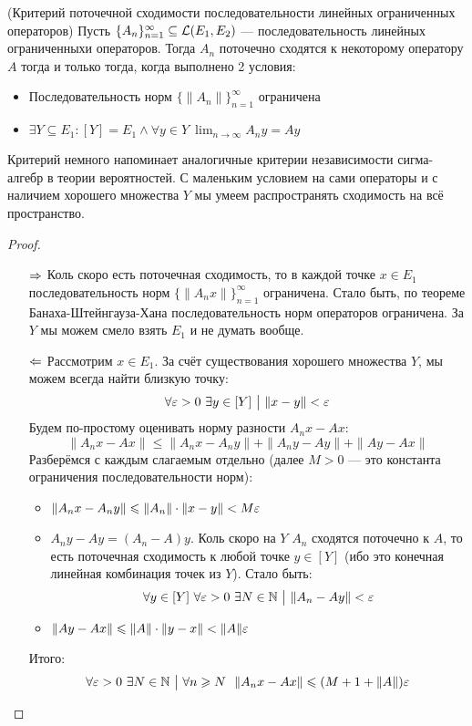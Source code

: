 \begin{theorem} (Критерий поточечной сходимости последовательности линейных ограниченных операторов)
	Пусть $\{A_n\}_{n = 1}^\infty \subseteq \mathcal{L}(E_1, E_2)$ --- последовательность линейных ограниченныхи операторов. Тогда $A_n$ поточечно сходятся к некоторому оператору $A$ тогда и только тогда, когда выполнено 2 условия:
	\begin{itemize}
		\item Последовательность норм $\{\|A_n\|\}_{n = 1}^\infty$ ограничена
		
		\item $\exists Y \subseteq E_1 \colon [Y] = E_1 \wedge \forall y \in Y\ \lim_{n \to \infty} A_ny = Ay$
	\end{itemize}
\end{theorem}

\begin{anote}
	Критерий немного напоминает аналогичные критерии независимости сигма-алгебр в теории вероятностей. С маленьким условием на сами операторы и с наличием хорошего множества $Y$ мы умеем распространять сходимость на всё пространство.
\end{anote}

\begin{proof}~
	\begin{itemize}
		\item[$\Rightarrow$] Коль скоро есть поточечная сходимость, то в каждой точке $x \in E_1$ последовательность норм $\{\|A_nx\|\}_{n = 1}^\infty$ ограничена. Стало быть, по теореме Банаха-Штейнгауза-Хана последовательность норм операторов ограничена. За $Y$ мы можем смело взять $E_1$ и не думать вообще.
		
		\item[$\Leftarrow$] Рассмотрим $x \in E_1$. За счёт существования хорошего множества $Y$, мы можем всегда найти близкую точку:
		\[
			\forall \varepsilon > 0\ \exists y \in [Y] \ \big|\  \|x - y\| < \varepsilon
		\]
		Будем по-простому оценивать норму разности $A_nx - Ax$:
		\[
			\|A_nx - Ax\| \le \|A_nx - A_ny\| + \|A_ny - Ay\| + \|Ay - Ax\|
		\]
		Разберёмся с каждым слагаемым отдельно (далее $M > 0$ --- это константа ограничения последовательности норм):
		\begin{itemize}
			\item $\|A_nx - A_ny\| \leqslant \|A_n\| \cdot \|x - y\| < M \varepsilon$
			
			\item $A_ny - Ay = (A_n - A)y$. Коль скоро на $Y$ $A_n$ сходятся поточечно к $A$, то есть поточечная сходимость к любой точке $y \in [Y]$ (ибо это конечная линейная комбинация точек из $Y$). Стало быть:
			\[
				\forall y \in [Y]\ \forall \varepsilon > 0\ \exists N \in \mathbb{N} \ \big|\  \|A_n - Ay\| < \varepsilon
			\]
			
			\item $\|Ay - Ax\| \leqslant \|A\| \cdot \|y - x\| < \|A\|\varepsilon$
		\end{itemize}
		Итого:
		\[
			\forall \varepsilon > 0\ \exists N \in \mathbb{N} \ \big|\  \forall n \geqslant N\ \ \|A_nx - Ax\| \leqslant (M + 1 + \|A\|)\varepsilon
		\]
	\end{itemize}
\end{proof}

